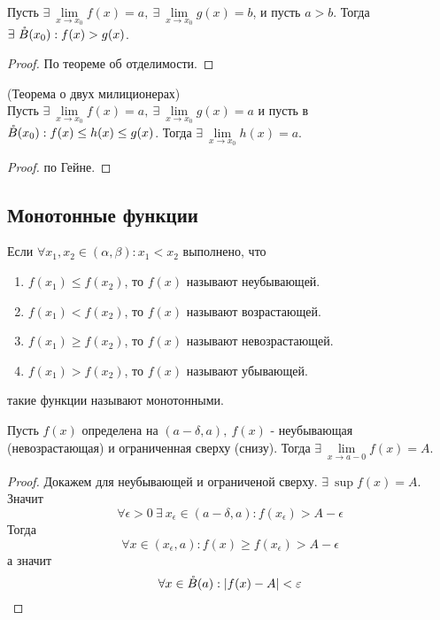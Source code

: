         \begin{theorem}
            Пусть $\exists\ \lim\limits_{x\to x_0}f(x)=a,\ \exists\ \lim\limits_{x\to x_0}g(x)=b$, и пусть $a>b$. Тогда $\exists\ \mathring{B}(x_0): f(x)>g(x)$.
        \end{theorem}
        \begin{proof}
            По теореме об отделимости.
        \end{proof} 
        \begin{theorem}(Теорема о двух милиционерах)\\
            Пусть $\exists\ \lim\limits_{x\to x_0}f(x)=a,\ \exists\ \lim\limits_{x\to x_0}g(x)=a$ и пусть в $\mathring{B}(x_0): f(x)\leq h(x)\leq g(x)$. Тогда $\exists\ \lim\limits_{x\to x_0}h(x)=a$.
        \end{theorem} 
        \begin{proof}
            по Гейне.
        \end{proof} 
    \subsection{Монотонные функции}
        \begin{definition}
            Если $\forall x_1, x_2\in (\alpha, \beta): x_1<x_2$ выполнено, что
            \begin{enumerate}
                \item $f(x_1)\leq f(x_2)$, то $f(x)$ называют неубывающей.
                \item $f(x_1)< f(x_2)$, то $f(x)$ называют возрастающей.
                \item $f(x_1)\geq f(x_2)$, то $f(x)$ называют невозрастающей.
                \item $f(x_1)> f(x_2)$, то $f(x)$ называют убывающей.
            \end{enumerate}
            такие функции называют монотонными.
        \end{definition} 
        \begin{theorem}
            Пусть $f(x)$ определена на $(a-\delta, a),\ f(x)$ - неубывающая (невозрастающая) и ограниченная сверху (снизу). Тогда $\exists\ \lim\limits_{x\to a-0}f(x)=A$.
        \end{theorem} 
        \begin{proof}
            Докажем для неубывающей и ограниченой сверху. $\exists\ \sup{f(x)}=A$. Значит
            \[\forall \epsilon>0\ \exists\ x_{\epsilon}\in (a-\delta, a): f(x_{\epsilon})>A-\epsilon\] 
            Тогда 
            \[\forall x\in (x_{\epsilon},a): f(x)\geq f(x_{\epsilon})>A-\epsilon\] 
            а значит
            \[\forall x\in \mathring{B}(a): |f(x)-A|<\varepsilon\]
        \end{proof}
